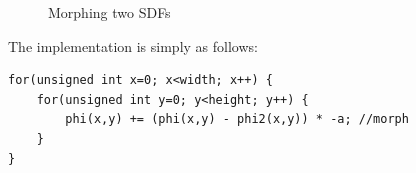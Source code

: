 \begin{figure}[h]
  \centering
  \caption{Morphing two SDFs}
\label{fig:morph}
\end{figure}


The implementation is simply as follows:

\begin{lstlisting}
for(unsigned int x=0; x<width; x++) {
    for(unsigned int y=0; y<height; y++) {
        phi(x,y) += (phi(x,y) - phi2(x,y)) * -a; //morph
    }
}
\end{lstlisting}


